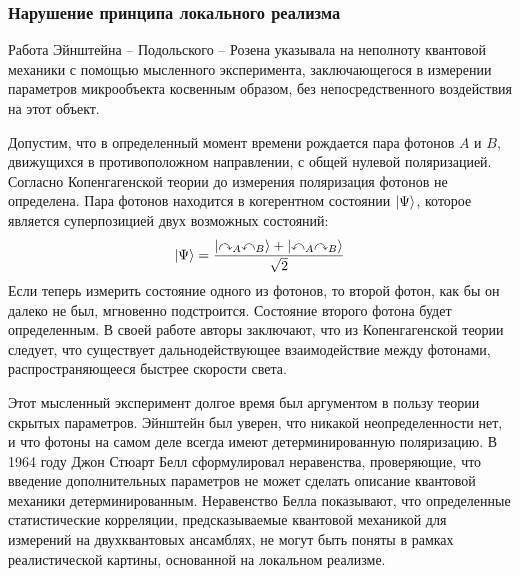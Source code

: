 
\subsubsection{Нарушение принципа локального реализма}
Работа Эйнштейна -- Подольского -- Розена\cite{Einstein1935}
указывала на неполноту квантовой механики с помощью мысленного эксперимента, 
заключающегося в измерении параметров микрообъекта косвенным образом,
без непосредственного воздействия на этот объект.

Допустим, что в определенный момент времени рождается пара фотонов $A$ и $B$,
движущихся в противоположном направлении, 
с общей нулевой поляризацией. 
Согласно Копенгагенской теории до измерения поляризация фотонов не определена.
Пара фотонов находится в когерентном состоянии $\left| \Psi \right\rangle$, 
которое является суперпозицией двух возможных состояний: 
\begin{equation}\label{eq:entangled-state}
  \left| \Psi \right\rangle = \dfrac{
    \left| \curvearrowright_A \curvearrowleft_B \right\rangle 
    + \left| \curvearrowleft_A \curvearrowright_B \right\rangle 
  }{\sqrt{2}}
\end{equation}
Если теперь измерить состояние одного из фотонов, 
то второй фотон, 
как бы он далеко не был, 
мгновенно подстроится.
Состояние второго фотона будет определенным. 
В своей работе\cite{Einstein1935} авторы заключают, 
что из Копенгагенской теории следует, 
что существует дальнодействующее взаимодействие между фотонами,
распространяющееся быстрее скорости света. 

Этот мысленный эксперимент долгое время был аргументом 
в пользу теории скрытых параметров. 
Эйнштейн был уверен, 
что никакой неопределенности нет, 
и что фотоны на самом деле всегда имеют детерминированную поляризацию. 
В 1964 году Джон Стюарт Белл сформулировал неравенства\cite{Bell1964},
проверяющие, 
что введение дополнительных параметров не может сделать описание квантовой механики детерминированным.  
Неравенство Белла показывают, 
что определенные статистические корреляции, 
предсказываемые квантовой механикой для измерений на двухквантовых ансамблях,
не могут быть поняты в рамках реалистической картины, 
основанной на локальном реализме\cite{Einstein1935}.

